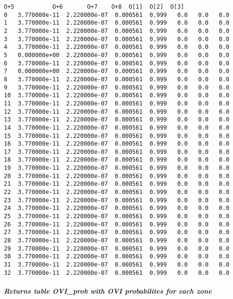 \documentclass[11pt]{article}
\begin{document}
\begin{tcolorbox}[breakable, size=fbox, boxrule=.5pt, pad at break*=1mm, opacityfill=0]
\begin{Verbatim}[commandchars=\\\{\}]
             O+5           O+6       O+7    O+8  O[1]  O[2]  O[3]
0   3.770000e-11  2.220000e-07  0.000561  0.999   0.0   0.0   0.0
1   3.770000e-11  2.220000e-07  0.000561  0.999   0.0   0.0   0.0
2   3.770000e-11  2.220000e-07  0.000561  0.999   0.0   0.0   0.0
3   3.770000e-11  2.220000e-07  0.000561  0.999   0.0   0.0   0.0
4   3.770000e-11  2.220000e-07  0.000561  0.999   0.0   0.0   0.0
5   0.000000e+00  2.220000e-07  0.000561  0.999   0.0   0.0   0.0
6   3.770000e-11  2.220000e-07  0.000561  0.999   0.0   0.0   0.0
7   0.000000e+00  2.220000e-07  0.000561  0.999   0.0   0.0   0.0
8   3.770000e-11  2.220000e-07  0.000561  0.999   0.0   0.0   0.0
9   3.770000e-11  2.220000e-07  0.000561  0.999   0.0   0.0   0.0
10  3.770000e-11  2.220000e-07  0.000561  0.999   0.0   0.0   0.0
11  3.770000e-11  2.220000e-07  0.000561  0.999   0.0   0.0   0.0
12  3.770000e-11  2.220000e-07  0.000561  0.999   0.0   0.0   0.0
13  3.770000e-11  2.220000e-07  0.000561  0.999   0.0   0.0   0.0
14  3.770000e-11  2.220000e-07  0.000561  0.999   0.0   0.0   0.0
15  3.770000e-11  2.220000e-07  0.000561  0.999   0.0   0.0   0.0
16  3.770000e-11  2.220000e-07  0.000561  0.999   0.0   0.0   0.0
17  3.770000e-11  2.220000e-07  0.000561  0.999   0.0   0.0   0.0
18  3.770000e-11  2.220000e-07  0.000561  0.999   0.0   0.0   0.0
19  3.770000e-11  2.220000e-07  0.000561  0.999   0.0   0.0   0.0
20  3.770000e-11  2.220000e-07  0.000561  0.999   0.0   0.0   0.0
21  3.770000e-11  2.220000e-07  0.000561  0.999   0.0   0.0   0.0
22  3.770000e-11  2.220000e-07  0.000561  0.999   0.0   0.0   0.0
23  3.770000e-11  2.220000e-07  0.000561  0.999   0.0   0.0   0.0
24  3.770000e-11  2.220000e-07  0.000561  0.999   0.0   0.0   0.0
25  3.770000e-11  2.220000e-07  0.000561  0.999   0.0   0.0   0.0
26  3.770000e-11  2.220000e-07  0.000561  0.999   0.0   0.0   0.0
27  3.770000e-11  2.220000e-07  0.000561  0.999   0.0   0.0   0.0
28  3.770000e-11  2.220000e-07  0.000561  0.999   0.0   0.0   0.0
29  3.770000e-11  2.220000e-07  0.000561  0.999   0.0   0.0   0.0
30  3.770000e-11  2.220000e-07  0.000561  0.999   0.0   0.0   0.0
31  3.770000e-11  2.220000e-07  0.000561  0.999   0.0   0.0   0.0
32  3.770000e-11  2.220000e-07  0.000561  0.999   0.0   0.0   0.0
\end{Verbatim}
\end{tcolorbox}
        
    \hypertarget{returns-table-ovi_prob-with-ovi-probabilites-for-each-zone}{%
\subparagraph{Returns table OVI\_prob with OVI probabilites for each
zone}\label{returns-table-ovi_prob-with-ovi-probabilites-for-each-zone}}
\end{document}
